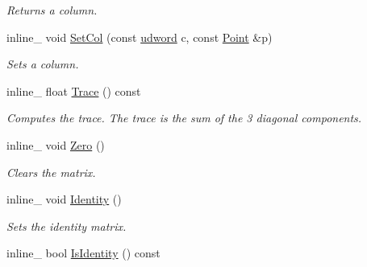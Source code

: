 \begin{DoxyCompactItemize}
\begin{DoxyCompactList}\small\item\em Returns a column. \end{DoxyCompactList}\item 
inline\+\_\+ void \hyperlink{classMatrix3x3_a806c9df77cbf6626a60be2850b1626fc}{Set\+Col} (const \hyperlink{IceTypes_8h_a44c6f1920ba5551225fb534f9d1a1733}{udword} c, const \hyperlink{classPoint}{Point} \&p)\hypertarget{classMatrix3x3_a806c9df77cbf6626a60be2850b1626fc}{}\label{classMatrix3x3_a806c9df77cbf6626a60be2850b1626fc}

\begin{DoxyCompactList}\small\item\em Sets a column. \end{DoxyCompactList}\item 
inline\+\_\+ float \hyperlink{classMatrix3x3_a45d850d0a4804a6d5de1aee1597e2001}{Trace} () const \hypertarget{classMatrix3x3_a45d850d0a4804a6d5de1aee1597e2001}{}\label{classMatrix3x3_a45d850d0a4804a6d5de1aee1597e2001}

\begin{DoxyCompactList}\small\item\em Computes the trace. The trace is the sum of the 3 diagonal components. \end{DoxyCompactList}\item 
inline\+\_\+ void \hyperlink{classMatrix3x3_a7d8c601a1aeb4f89cc51f54c9c5454f7}{Zero} ()\hypertarget{classMatrix3x3_a7d8c601a1aeb4f89cc51f54c9c5454f7}{}\label{classMatrix3x3_a7d8c601a1aeb4f89cc51f54c9c5454f7}

\begin{DoxyCompactList}\small\item\em Clears the matrix. \end{DoxyCompactList}\item 
inline\+\_\+ void \hyperlink{classMatrix3x3_adc929f7f8eee58f37fbc29f3eefe3a08}{Identity} ()\hypertarget{classMatrix3x3_adc929f7f8eee58f37fbc29f3eefe3a08}{}\label{classMatrix3x3_adc929f7f8eee58f37fbc29f3eefe3a08}

\begin{DoxyCompactList}\small\item\em Sets the identity matrix. \end{DoxyCompactList}\item 
inline\+\_\+ bool \hyperlink{classMatrix3x3_a0ecdee706e3a985063e3b372da19fbbc}{Is\+Identity} () const \hypertarget{classMatrix3x3_a0ecdee706e3a985063e3b372da19fbbc}{}\label{classMatrix3x3_a0ecdee706e3a985063e3b372da19fbbc}


\end{DoxyCompactItemize}
